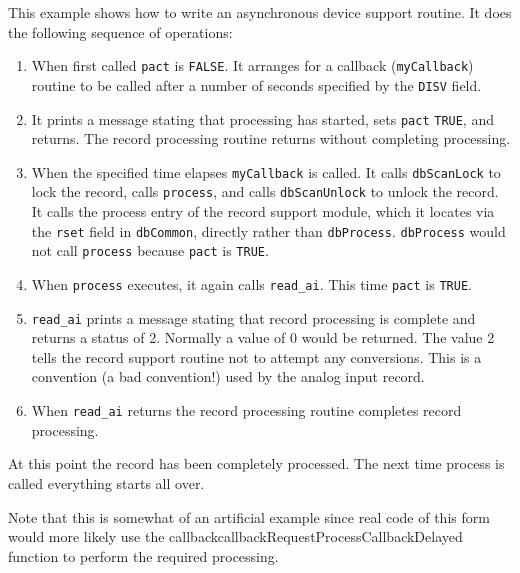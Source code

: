 This example shows how to write an asynchronous device support routine. It does the following sequence of operations:

\begin{enumerate}\item When first called \verb|pact| is \verb|FALSE|. It arranges for a callback (\verb|myCallback|) routine to be called after a number of 
seconds specified by the \verb|DISV| field.

\item It prints a message stating that processing has started, sets \verb|pact| \verb|TRUE|, and returns. The record processing routine 
returns without completing processing.

\item When the specified time elapses \verb|myCallback| is called. It calls \verb|dbScanLock| to lock the record, calls \verb|process|, 
and calls \verb|dbScanUnlock| to unlock the record. It calls the process entry of the record support module, which it 
locates via the \verb|rset| field in \verb|dbCommon|, directly rather than \verb|dbProcess|. \verb|dbProcess| would not call \verb|process| 
because \verb|pact| is \verb|TRUE|. 

\item When \verb|process| executes, it again calls \verb|read_ai|. This time \verb|pact| is \verb|TRUE|.

\item \verb|read_ai| prints a message stating that record processing is complete and returns a status of 2. Normally a value of  
0 would be returned. The value 2 tells the record support routine not to attempt any conversions. This is a 
convention (a bad convention!) used by the analog input record.

\item When \verb|read_ai| returns the record processing routine completes record processing.

\end{enumerate}At this point the record has been completely processed. The next time process is called everything starts all over.

Note that this is somewhat of an artificial example since real code of this form would more likely use the 
callbackcallbackRequestProcessCallbackDelayed function to perform the required processing.

